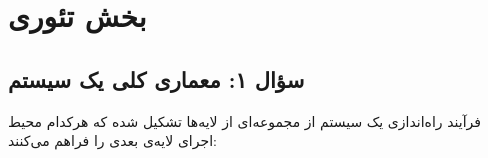 
\section{بخش تئوری}

\subsection{سؤال ۱: معماری کلی یک سیستم }

فرآیند راه‌اندازی یک سیستم  از مجموعه‌ای از لایه‌ها تشکیل شده که هرکدام محیط اجرای لایه‌ی بعدی را فراهم می‌کنند:

